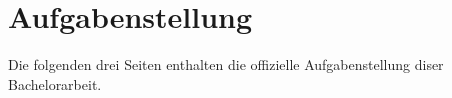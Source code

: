\chapter{Aufgabenstellung}
Die folgenden drei Seiten enthalten die offizielle Aufgabenstellung diser Bachelorarbeit.

